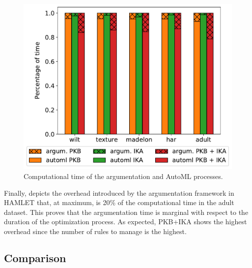 \begin{figure}[t]
    \centering
    \includegraphics[scale=.43]{chapters/human-centric/hamlet/img/time.pdf}
    \caption{Computational time of the argumentation and AutoML processes.}
    \label{hamlet-fig:effoverhead}
\end{figure}


Finally,  depicts the overhead introduced by the argumentation framework in HAMLET that, at maximum, is 20\% of the computational time in the adult dataset.
This proves that the argumentation time is marginal with respect to the duration of the optimization process.
As expected, PKB+IKA shows the highest overhead since the number of rules to manage is the highest.

\subsection{Comparison}

